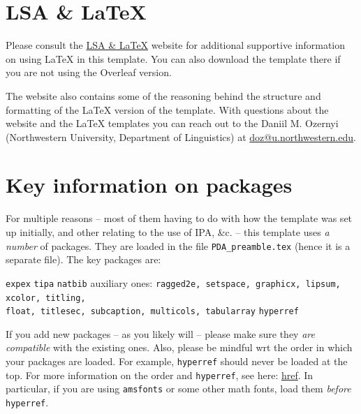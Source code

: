 {\let\newpage\relax\maketitle}
\vspace{-12pt}

\begin{abstract}
\small{
The instructions for working with this template on Overleaf are given \href{h}{here}. The abstract should be no more than 200 words. The details above the solid bar, as well as the text in the headers, will be filled in by the editorial team.}
\end{abstract}


\section{LSA \& \LaTeX{}}
Please consult the \href{https://dozernyi.gitlab.io/lsalatex/}{LSA \& \LaTeX{}} website for additional supportive information on using \LaTeX{} in this template. You can also download the template there if you are not using the Overleaf version. 

The website also contains some of the reasoning behind the structure and formatting of the \LaTeX{} version of the template. With questions about the website and the \LaTeX{} templates you can reach out to the Daniil M. Ozernyi (Northwestern University, Department of Linguistics) at \href{mailto:doz@u.northwestrn.edu}{doz@u.northwestern.edu}.


\section{Key information on packages}
For multiple reasons -- most of them having to do with how the template was set up initially, and other relating to the use of IPA, \&c. -- this template uses \textit{a number} of packages. They are loaded in the file \verb=PDA_preamble.tex= (hence it is a separate file). The key packages are:

\pex
\a \verb=expex=
\a \verb=tipa=
\a \verb=natbib= 
\a auxiliary ones: \verb=ragged2e, setspace, graphicx, lipsum, xcolor, titling,= \\ \verb=float, titlesec, subcaption, multicols, tabularray=
\a \verb=hyperref=
\xe

If you add new packages -- as you likely will -- please make sure they \textit{are compatible} with the existing ones. Also, please be mindful wrt the order in which your packages are loaded. For example, \verb=hyperref= should never be loaded at the top. For more information on the order and \verb=hyperref=, see here: \href{https://texblog.net/hyperref/}{href}. In particular, if you are using \verb=amsfonts= or some other math fonts, load them \textit{before} \verb=hyperref=.

